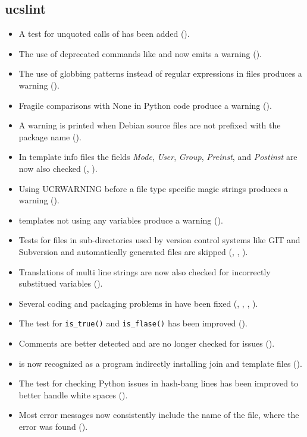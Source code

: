 \subsection{ucslint}
\begin{itemize}
\item A test for unquoted calls of  has
  been added ().
\item The use of deprecated commands like
   and 
  now emits a warning ().
\item The use of globbing patterns instead of regular expressions in
  \ucsUCR{} files produces a warning
  ().
\item Fragile comparisons with None in Python code produce a warning
  ().
\item A warning is printed when Debian source files are not prefixed
  with the package name ().
\item In \ucsUCR{} template info files the fields \emph{Mode},
  \emph{User}, \emph{Group}, \emph{Preinst}, and \emph{Postinst} are
  now also checked (, ).
\item Using UCRWARNING before a file type specific magic strings
  produces a warning ().
\item \ucsUCR{} templates not using any \ucsUCR{} variables produce a
  warning ().
\item Tests for files in sub-directories used by version control
  systems like GIT and Subversion and automatically generated files
  are skipped (, , ).
\item Translations of multi line strings are now also checked for
  incorrectly substitued variables ().
\item Several coding and packaging problems in 
  have been fixed (, , ,
  ).
\item The test for \ucsUCR{} \verb|is_true()| and \verb|is_flase()|
  has been improved ().
\item Comments are better detected and are no longer checked for
  issues ().
\item {} is now recognized as a
  program indirectly installing join and template files
  ().
\item The test for checking Python issues in hash-bang lines has been
  improved to better handle white spaces ().
\item Most error messages now consistently include the name of the
  file, where the error was found ().
\end{itemize}

